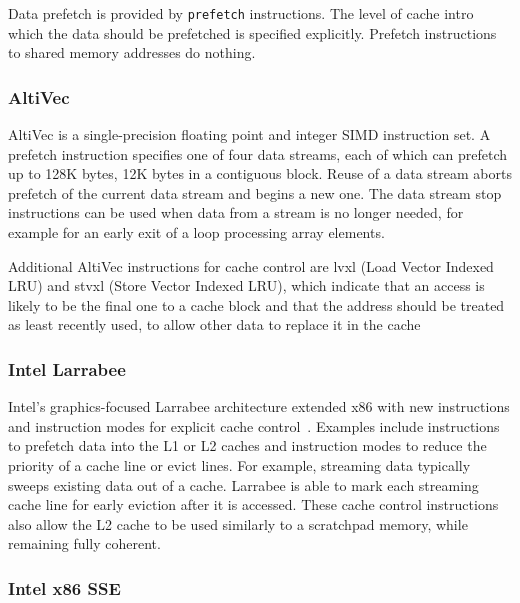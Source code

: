 Data prefetch is provided by \verb=prefetch= instructions. The level of cache intro which the data should be prefetched is specified explicitly. Prefetch instructions to shared memory addresses do nothing.

\subsubsection{AltiVec}
AltiVec is a single-precision floating point and integer SIMD instruction set.
A prefetch instruction specifies one of four data streams, each of which can prefetch up to 128K bytes, 12K bytes in a contiguous block. Reuse of a data stream aborts prefetch of the current data stream and begins a new one. The data stream stop instructions can be used when data from a stream is no longer needed, for example for an early exit of a loop processing array elements.

Additional AltiVec instructions for cache control are lvxl (Load Vector Indexed LRU) and stvxl (Store Vector Indexed LRU), which indicate that an access is likely to be the final one to a cache block and that the address should be treated as least recently used, to allow other data to replace it in the cache~\cite{}

\subsubsection{Intel Larrabee}
Intel's graphics-focused Larrabee architecture extended x86 with new instructions and instruction modes for explicit cache control~\cite{Seiler:2008:LMX:1360612.1360617}.
Examples include instructions to prefetch data into the L1 or L2 caches and instruction modes to reduce the priority of a cache line or evict lines. For example, streaming data typically sweeps existing data out of a cache. Larrabee is able to mark each streaming cache line for early eviction after it is accessed. These cache control instructions also allow the L2 cache to be used similarly to a scratchpad memory, while remaining fully coherent.

\subsubsection{Intel x86 SSE}

